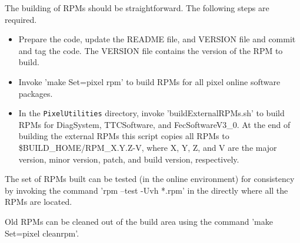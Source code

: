 The building of RPMs should be straightforward. The
following steps are required.
\begin{itemize}
\item Prepare the code, update the README file, and VERSION file and
      commit and tag the code. The VERSION file contains the version
      of the RPM to build.
\item Invoke 'make Set=pixel rpm' to build RPMs for all pixel online software 
      packages.
\item In the {\tt PixelUtilities} directory, invoke 'buildExternalRPMs.sh'
      to build RPMs for DiagSystem, TTCSoftware, and FecSoftwareV3\_0.
      At the end of building the external RPMs this script copies
      all RPMs to \$BUILD\_HOME/RPM\_X.Y.Z-V, where X, Y, Z, and V are
      the major version, minor version, patch, and build version, 
      respectively.
\end{itemize}
The set of RPMs built can be tested (in the online environment) for
consistency by invoking the command 'rpm --test -Uvh *.rpm' in the directly
where all the RPMs are located.

Old RPMs can be cleaned out of the build area using the command 'make Set=pixel cleanrpm'.

\clearpage

